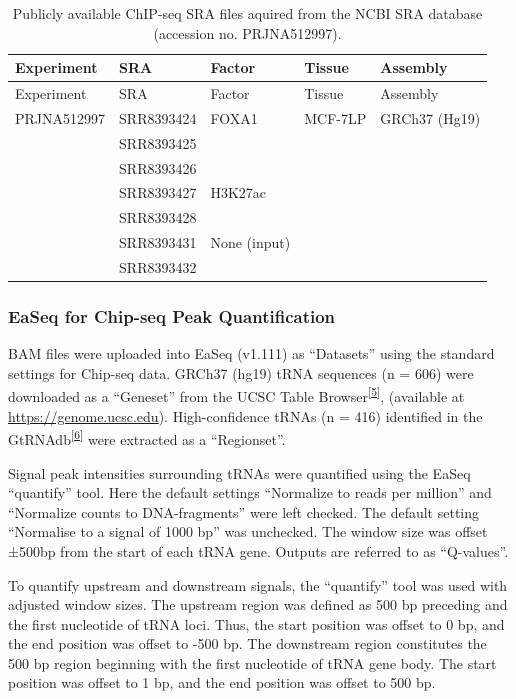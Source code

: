 \documentclass[
  12pt,
]{article}
\begin{document}
\begin{longtable}[]{@{}lllll@{}}
\caption{\label{tab:data}Publicly available ChIP-seq SRA files aquired from the NCBI SRA database (accession no. PRJNA512997).}\tabularnewline
\toprule()
Experiment & SRA & Factor & Tissue & Assembly \\
\midrule()
\endfirsthead
\toprule()
Experiment & SRA & Factor & Tissue & Assembly \\
\midrule()
\endhead
PRJNA512997 & SRR8393424 & FOXA1 & MCF-7LP & GRCh37 (Hg19) \\
& SRR8393425 & & & \\
& SRR8393426 & & & \\
& SRR8393427 & H3K27ac & & \\
& SRR8393428 & & & \\
& SRR8393431 & None (input) & & \\
& SRR8393432 & & & \\
\bottomrule()
\end{longtable}

\hypertarget{easeq-for-chip-seq-peak-quantification}{%
\subsubsection{EaSeq for Chip-seq Peak Quantification}\label{easeq-for-chip-seq-peak-quantification}}

BAM files were uploaded into EaSeq (v1.111) as ``Datasets'' using the standard settings for Chip-seq data.
GRCh37 (hg19) tRNA sequences (n = 606) were downloaded as a ``Geneset'' from the UCSC Table Browser\textsuperscript{{[}\protect\hyperlink{ref-Karolchik2004}{5}{]}}, (available at \url{https://genome.ucsc.edu}).
High-confidence tRNAs (n = 416) identified in the GtRNAdb\textsuperscript{{[}\protect\hyperlink{ref-Chan2016}{6}{]}} were extracted as a ``Regionset''.

Signal peak intensities surrounding tRNAs were quantified using the EaSeq ``quantify'' tool.
Here the default settings ``Normalize to reads per million'' and ``Normalize counts to DNA-fragments'' were left checked.
The default setting ``Normalise to a signal of 1000 bp'' was unchecked.
The window size was offset ±500bp from the start of each tRNA gene.
Outputs are referred to as ``Q-values''.

To quantify upstream and downstream signals, the ``quantify'' tool was used with adjusted window sizes.
The upstream region was defined as 500 bp preceding and the first nucleotide of tRNA loci.
Thus, the start position was offset to 0 bp, and the end position was offset to -500 bp.
The downstream region constitutes the 500 bp region beginning with the first nucleotide of tRNA gene body.
The start position was offset to 1 bp, and the end position was offset to 500 bp.
\end{document}
